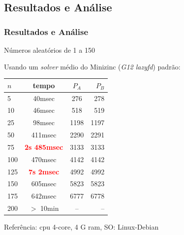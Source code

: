 \documentclass{beamer}
\begin{document}
\begin{frame}[fragile]

{\small
}
\end{frame}


\subsection{Resultados e Análise}
\begin{frame}
\frametitle{Resultados e Análise}
\begin{block}{Números aleatórios de 1 a 150}

Usando um \textit{solver} médio do Minizinc (\textit{G12 lazyfd}) padrão:

\begin{center}
  \begin{tabular}{ l | c |c | r }
    \hline  \hline 
    $n$ & tempo & $P_A$ & $P_B$\\ \hline     \hline 
     5 & 40msec & 276 & 278 \\ \hline
    10 & 46msec & 518 & 519 \\ \hline
    25 & 98msec & 1198 & 1197 \\ \hline
    50 & 411msec & 2290 & 2291 \\ \hline
    75 & \textbf{\textcolor{red}{2s 485msec}} & 3133 & 3133 \\ \hline
    100 & 470msec & 4142 & 4142 \\ \hline 
    125 & \textbf{\textcolor{red}{7s 2msec}} & 4992 & 4992 \\ \hline 
    150 & 605msec & 5823 & 5823 \\ \hline 
    175 & 642msec &   6777 &  6778 \\ \hline 
    200 & $>$ 10min & -- & -- \\ \hline \hline
  \end{tabular}
\end{center}

Referência: cpu 4-core, 4 G ram, SO: Linux-Debian


\end{block}
\end{frame}

\end{document}
